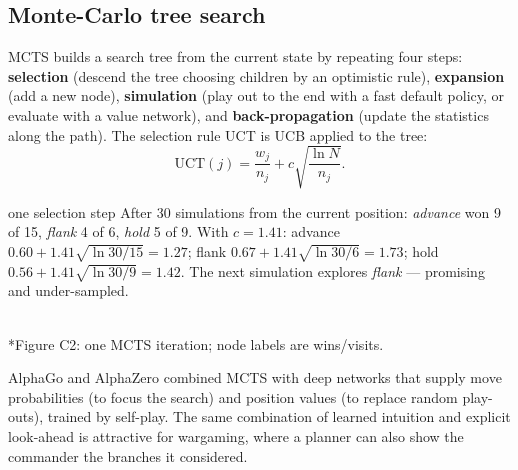 \documentclass[11pt]{article}
\begin{document}
\subsection{Monte-Carlo tree search}
MCTS builds a search tree from the current state by repeating four steps: \textbf{selection} (descend the tree choosing children by an optimistic rule), \textbf{expansion} (add a new node), \textbf{simulation} (play out to the end with a fast default policy, or evaluate with a value network), and \textbf{back-propagation} (update the statistics along the path). The selection rule UCT is UCB applied to the tree:
\[\text{UCT}(j)=\frac{w_j}{n_j}+c\sqrt{\frac{\ln N}{n_j}}.\]
\begin{example}{one selection step}
After 30 simulations from the current position: \emph{advance} won 9 of 15, \emph{flank} 4 of 6, \emph{hold} 5 of 9. With $c=1.41$: advance $0.60+1.41\sqrt{\ln30/15}=1.27$; flank $0.67+1.41\sqrt{\ln30/6}=1.73$; hold $0.56+1.41\sqrt{\ln30/9}=1.42$. The next simulation explores \emph{flank} --- promising and under-sampled.
\end{example}
\begin{center}\\*{\small\color{GreyN}Figure C2: one MCTS iteration; node labels are wins/visits.}\end{center}

AlphaGo and AlphaZero combined MCTS with deep networks that supply move probabilities (to focus the search) and position values (to replace random play-outs), trained by self-play. The same combination of learned intuition and explicit look-ahead is attractive for wargaming, where a planner can also show the commander the branches it considered.
\end{document}
